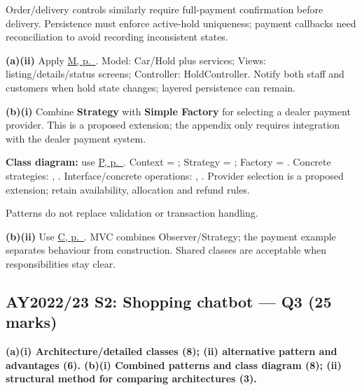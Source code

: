 \begin{studycolumns}
\vspace{0pt}





Order/\allowbreak{}delivery controls similarly require full-payment confirmation before delivery. Persistence must enforce active-hold uniqueness; payment callbacks need reconciliation to avoid recording inconsistent states.

\textbf{(a)(ii)} Apply \hyperref[answer-mvc]{M, p.\ \pageref{answer-mvc}}. Model: Car/Hold plus services; Views: listing/details/status screens; Controller: HoldController. Notify both staff and customers when hold state changes; layered persistence can remain.

\textbf{(b)(i)} Combine \textbf{Strategy} with \textbf{Simple Factory} for selecting a dealer payment provider. This is a proposed extension; the appendix only requires integration with the dealer payment system.


\textbf{Class diagram:} use \hyperref[shared-pattern]{P, p.\ \pageref{shared-pattern}}. Context = ; Strategy = ; Factory = . Concrete strategies: , . Interface/concrete operations: , . Provider selection is a proposed extension; retain availability, allocation and refund rules.



Patterns do not replace validation or transaction handling.

\textbf{(b)(ii)} Use \hyperref[answer-pattern-cost]{C, p.\ \pageref{answer-pattern-cost}}. MVC combines Observer/Strategy; the payment example separates behaviour from construction. Shared classes are acceptable when responsibilities stay clear.
\end{studycolumns}

\par\Needspace{85pt}\subsection*{AY2022/23 S2: Shopping chatbot --- Q3 (25 marks)}\label{old-2223-s2-q3}

\textbf{(a)(i) Architecture/\allowbreak{}detailed classes (8); (ii) alternative pattern and advantages (6). (b)(i) Combined patterns and class diagram (8); (ii) structural method for comparing architectures (3).}


